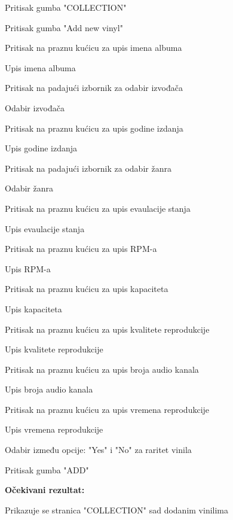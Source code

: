 					\begin{packed_enum}
					
						\item Pritisak gumba "COLLECTION"
						\item Pritisak gumba "Add new vinyl"
						\item Pritisak na praznu kućicu za upis imena albuma
						\item Upis imena albuma
						\item Pritisak na padajući izbornik za odabir izvođača
						\item Odabir izvođača
						\item Pritisak na praznu kućicu za upis godine izdanja
						\item Upis godine izdanja
						\item Pritisak na padajući izbornik za odabir žanra
						\item Odabir žanra
						\item Pritisak na praznu kućicu za upis evaulacije stanja
						\item Upis evaulacije stanja
						\item Pritisak na praznu kućicu za upis RPM-a
						\item Upis RPM-a
						\item Pritisak na praznu kućicu za upis kapaciteta
						\item Upis kapaciteta
						\item Pritisak na praznu kućicu za upis kvalitete reprodukcije
						\item Upis kvalitete reprodukcije
						\item Pritisak na praznu kućicu za upis broja audio kanala
						\item Upis broja audio kanala
						\item Pritisak na praznu kućicu za upis vremena reprodukcije
						\item Upis vremena reprodukcije
						\item Odabir između opcije: "Yes" i "No" za raritet vinila
						\item Pritisak gumba "ADD"
						
					\end{packed_enum}
				
				\noindent\textbf{Očekivani rezultat:}
				
					\begin{packed_enum}
					
						\item Prikazuje se stranica "COLLECTION" sad dodanim vinilima
						
					\end{packed_enum}
				
